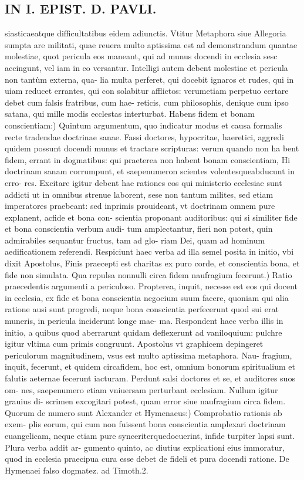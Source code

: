 \documentclass{article}
\begin{document}
\begin{pages}
\section*{IN I. EPIST. D. PAVLI. }
\marginpar{[ p.60 ]}\pstart siasticaeatque  difficultatibus eidem adiunctis. Vtitur Metaphora siue Allegoria sumpta are militati, quae reuera multo aptissima est ad demonstrandum quantae molestiae, quot pericula eos maneant, qui ad munus docendi in ecclesia sesc accingunt, vel iam in eo versantur. Intelligi autem debent molestiae et pericula non tantùm externa, qua- lia multa perferet, qui docebit ignaros et rudes, qui in uiam reducet errantes, qui con solabitur afflictos: verumetiam perpetuo certare debet cum falsis fratribus, cum hae- reticis, cum philosophis, denique  cum ipso satana, qui mille modis ecclestas interturbat.  \pend\pstart Habens fidem et bonam conscientiam:) Quintum argumentum, quo indicatur modus et causa formalis recte tradendae doctrinae sanae. Fassi doctores, hypocritae, haeretici, aggredi quidem possunt docendi munus et tractare scripturas: verum quando non ha bent fidem, errant in dogmatibus: qui praeterea non habent bonam conscientiam, Hi doctrinam sanam corrumpunt, et saepenumeron scientes volentesqueabducunt in erro- res. Excitare igitur debent hae rationes eos qui ministerio ecclesiae sunt addicti ut in omnibus strenue laborent, sese non tantum milites, sed etiam imperatores praebeant: sed inprimis prouideant, vt doctrinam omnem pure explanent, acfide et bona con- scientia proponant auditoribus: qui si similiter fide et bona conscientia verbum audi- tum amplectantur, fieri non potest, quin admirabiles sequantur fructus, tam ad glo- riam Dei, quam ad hominum aedificationem referendi. Respiciunt haec verba ad illa semel posita in initio, vbi dixit Apostolus, Finis praecepti est charitas ex puro corde, et conscientia bona, et fide non simulata.  \pend{} Qua repulsa nonnulli circa fidem naufragium fecerunt.) Ratio praecedentis argumenti a periculoso. Propterea, inquit, necesse est eos qui docent in ecclesia, ex fide et bona conscientia negocium suum facere, quoniam qui alia ratione ausi sunt progredi, neque  bona conscientia perfecerunt quod sui erat muneris, in pericula inciderunt longe mae- ma. Respondent haec verba illis in initio, a quibus quod aberrarunt quidam deflexerunt ad vaniloquium: pulchre igitur vltima cum primis congruunt. Apostolus vt graphicem depingeret periculorum magnitudinem, vsus est multo aptissima metaphora. Nau- fragium, inquit, fecerunt, et quidem circafidem, hoc est, omnium bonorum spiritualium et falutis aeternae fecerunt iacturam. Perdunt salsi doctores et se, et auditores suos om- nes, saepenumero etiam vniuersam perturbant ecclesiam. Nullum igitur grauius di- scrimen excogitari potest, quam error siue naufragium circa fidem.  \pend\pstart Quorum de numero sunt Alexander et Hymenaeus:) Comprobatio rationis ab exem- plis eorum, qui cum non fuissent bona conscientia amplexari doctrinam euangelicam, neque  etiam pure synceriterquedocuerint, infide turpiter lapsi sunt. Plura verba addit ar- gumento quinto, ac diutius explicationi eius immoratur, quod in ecclesia praecipua cura esse debet de fideli et pura docendi ratione. De Hymenaei falso dogmatez. ad Timoth.2. 
\end{pages}
\end{document}
